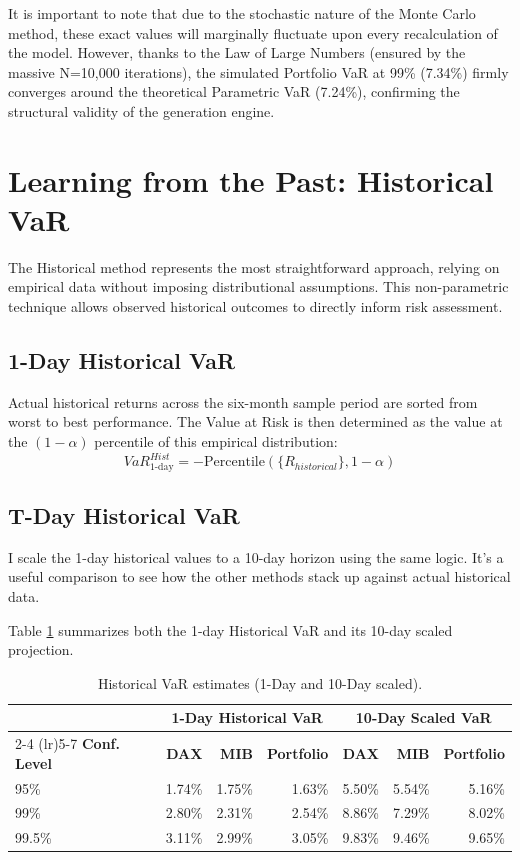 \documentclass{report}
\begin{document}
It is important to note that due to the stochastic nature of the Monte Carlo method, these exact values will marginally fluctuate upon every recalculation of the model. However, thanks to the Law of Large Numbers (ensured by the massive N=10,000 iterations), the simulated Portfolio VaR at 99\% (7.34\%) firmly converges around the theoretical Parametric VaR (7.24\%), confirming the structural validity of the generation engine.

\section{Learning from the Past: Historical VaR}
The Historical method represents the most straightforward approach, relying on empirical data without imposing distributional assumptions. This non-parametric technique allows observed historical outcomes to directly inform risk assessment.

\subsection{1-Day Historical VaR}
Actual historical returns across the six-month sample period are sorted from worst to best performance. The Value at Risk is then determined as the value at the $(1-\alpha)$ percentile of this empirical distribution:
\[ VaR_{1\text{-day}}^{Hist} = -\text{Percentile}\left(\{R_{historical}\}, 1-\alpha\right) \]

\subsection{T-Day Historical VaR}
I scale the 1-day historical values to a 10-day horizon using the same logic. It's a useful comparison to see how the other methods stack up against actual historical data.

Table \ref{tab:historical} summarizes both the 1-day Historical VaR and its 10-day scaled projection.

\begin{table}[H]
    \centering
    \begin{tabular}{lrrr|rrr}
        \toprule
        & \multicolumn{3}{c}{\textbf{1-Day Historical VaR}} & \multicolumn{3}{c}{\textbf{10-Day Scaled VaR}} \\
        \cmidrule(lr){2-4} \cmidrule(lr){5-7}
        \textbf{Conf. Level} & \textbf{DAX} & \textbf{MIB} & \textbf{Portfolio} & \textbf{DAX} & \textbf{MIB} & \textbf{Portfolio} \\
        \midrule
        95\% & 1.74\% & 1.75\% & 1.63\% & 5.50\% & 5.54\% & 5.16\% \\
        99\% & 2.80\% & 2.31\% & 2.54\% & 8.86\% & 7.29\% & 8.02\% \\
        99.5\% & 3.11\% & 2.99\% & 3.05\% & 9.83\% & 9.46\% & 9.65\% \\
        \bottomrule
    \end{tabular}
    \caption{Historical VaR estimates (1-Day and 10-Day scaled).}
    \label{tab:historical}
\end{table}
\end{document}
